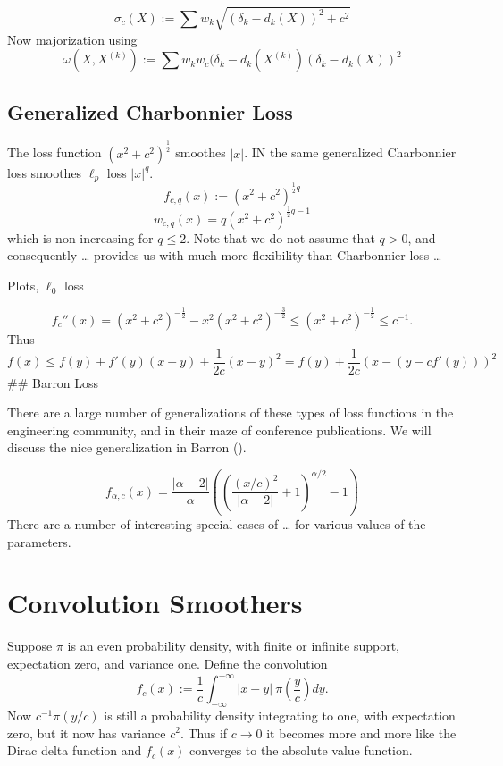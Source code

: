 \documentclass[
  12pt,
  letterpaper,
  DIV=11,
  numbers=noendperiod]{scrartcl}
\newcommand{\sectionbreak}{\pagebreak}
\begin{document}
\[
\sigma_c(X):=\sum w_k\sqrt{(\delta_k-d_k(X))^2+c^2}
\] Now majorization using \[
\omega(X,X^{(k)}):=\sum w_kw_c(\delta_k-d_k(X^{(k)})(\delta_k-d_k(X))^2
\]

\subsection{Generalized Charbonnier
Loss}\label{generalized-charbonnier-loss}

The loss function \((x^2+c^2)^\frac12\) smoothes \(|x|\). IN the same
generalized Charbonnier loss smoothes \(\ell_p\) loss \(|x|^q\). \[
f_{c,q}(x):=(x^2+c^2)^{\frac12q}
\] \[
w_{c,q}(x)=q(x^2+c^2)^{\frac12q-1}
\] which is non-increasing for \(q\leq 2\). Note that we do not assume
that \(q>0\), and consequently \ldots{} provides us with much more
flexibility than Charbonnier loss \ldots{}

Plots, \(\ell_0\) loss

\[
f_c''(x)=(x^2 + c^2)^{-\frac12}-x^2(x^2 + c^2)^{-\frac32}\leq(x^2 + c^2)^{-\frac12}\leq c^{-1}.
\] Thus \[
f(x)\leq f(y)+f'(y)(x-y)+\frac{1}{2c}(x-y)^2=f(y)+\frac{1}{2c}(x-(y-cf'(y)))^2
\] \#\# Barron Loss

There are a large number of generalizations of these types of loss
functions in the engineering community, and in their maze of conference
publications. We will discuss the nice generalization in Barron
().

\[
f_{\alpha,c}(x)=\frac{|\alpha-2|}{\alpha}\left(\left(\frac{(x/c)^2}{|\alpha-2|}+1\right)^{\alpha/2}-1\right)
\] There are a number of interesting special cases of \ldots{} for
various values of the parameters.

\sectionbreak

\section{Convolution Smoothers}\label{convolution-smoothers}

Suppose \(\pi\) is an even probability density, with finite or infinite
support, expectation zero, and variance one. Define the convolution \[
f_c(x):=\frac{1}{c}\int_{-\infty}^{+\infty}|x-y|\ \pi(\frac{y}{c})dy.
\] Now \(c^{-1}\pi(y/c)\) is still a probability density integrating to
one, with expectation zero, but it now has variance \(c^2\). Thus if
\(c\rightarrow 0\) it becomes more and more like the Dirac delta
function and \(f_c(x)\) converges to the absolute value function.
\end{document}
